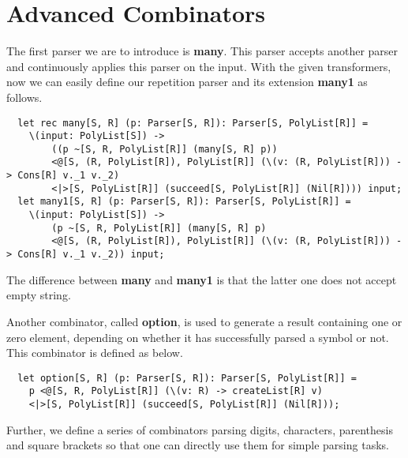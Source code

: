 \section{Advanced Combinators}
The first parser we are to introduce is \textbf{many}. This parser accepts another parser and continuously applies this parser on the input. With the given transformers, now we can easily define our repetition parser and its extension \textbf{many1} as follows.
\begin{lstlisting}
  let rec many[S, R] (p: Parser[S, R]): Parser[S, PolyList[R]] =
	\(input: PolyList[S]) ->
		((p ~[S, R, PolyList[R]] (many[S, R] p)) 
		<@[S, (R, PolyList[R]), PolyList[R]] (\(v: (R, PolyList[R])) -> Cons[R] v._1 v._2)
		<|>[S, PolyList[R]] (succeed[S, PolyList[R]] (Nil[R]))) input;
  let many1[S, R] (p: Parser[S, R]): Parser[S, PolyList[R]] =
	\(input: PolyList[S]) ->
		(p ~[S, R, PolyList[R]] (many[S, R] p)
		<@[S, (R, PolyList[R]), PolyList[R]] (\(v: (R, PolyList[R])) -> Cons[R] v._1 v._2)) input;
\end{lstlisting}
The difference between \textbf{many} and \textbf{many1} is that the latter one does not accept empty string.

Another combinator, called \textbf{option}, is used to generate a result containing one or zero element, depending on whether it has successfully parsed a symbol or not. This combinator is defined as below.
\begin{lstlisting}
  let option[S, R] (p: Parser[S, R]): Parser[S, PolyList[R]] =
	p <@[S, R, PolyList[R]] (\(v: R) -> createList[R] v)
	<|>[S, PolyList[R]] (succeed[S, PolyList[R]] (Nil[R]));
\end{lstlisting}
Further, we define a series of combinators parsing digits, characters, parenthesis and square brackets so that one can directly use them for simple parsing tasks.

